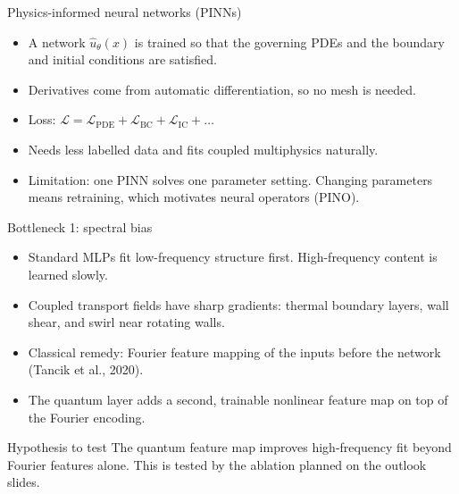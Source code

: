 \documentclass[aspectratio=169]{beamer}
\begin{document}
\begin{frame}{Physics-informed neural networks (PINNs)}
\begin{itemize}
  \item A network $\hat u_\theta(x)$ is trained so that the governing PDEs and the boundary and initial conditions are satisfied.
  \item Derivatives come from automatic differentiation, so no mesh is needed.
  \item Loss: $\mathcal{L} = \mathcal{L}_{\mathrm{PDE}} + \mathcal{L}_{\mathrm{BC}} + \mathcal{L}_{\mathrm{IC}} + \dots$
  \item Needs less labelled data and fits coupled multiphysics naturally.
  \item Limitation: one PINN solves one parameter setting. Changing parameters means retraining, which motivates neural operators (PINO).
\end{itemize}
\end{frame}

\begin{frame}{Bottleneck 1: spectral bias}
\begin{itemize}
  \item Standard MLPs fit low-frequency structure first. High-frequency content is learned slowly.
  \item Coupled transport fields have sharp gradients: thermal boundary layers, wall shear, and swirl near rotating walls.
  \item Classical remedy: Fourier feature mapping of the inputs before the network (Tancik et al., 2020).
  \item The quantum layer adds a second, trainable nonlinear feature map on top of the Fourier encoding.
\end{itemize}
\vspace{0.3cm}
\begin{alertblock}{Hypothesis to test}
The quantum feature map improves high-frequency fit beyond Fourier features alone. This is tested by the ablation planned on the outlook slides.
\end{alertblock}
\end{frame}
\end{document}

